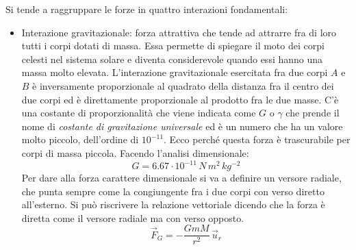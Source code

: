 \documentclass[10pt,a4paper]{book}
\begin{document}
Si tende a raggruppare le forze in quattro interazioni fondamentali:
\begin{itemize}
	\item Interazione gravitazionale: forza attrattiva che tende ad attrarre fra di loro tutti i corpi dotati di massa. Essa permette di spiegare il moto dei corpi celesti nel sistema solare e diventa considerevole quando essi hanno una massa molto elevata. L'interazione gravitazionale esercitata fra due corpi $A$ e $B$ è inversamente proporzionale al quadrato della distanza fra il centro dei due corpi ed è direttamente proporzionale al prodotto fra le due masse. C'è una costante di proporzionalità che viene indicata come $G$ o $\gamma$ che prende il nome di \emph{costante di gravitazione universale} ed è un numero che ha un valore molto piccolo, dell'ordine di $10^{-11}$. Ecco perché questa forza è trascurabile per corpi di massa piccola.
	Facendo l'analisi dimensionale:
	\[
		G=6.67\cdot 10^{-11} \, N\,m^2\,kg^{-2}
	\]
	Per dare alla forza carattere dimensionale si va a definire un versore radiale, che punta sempre come la congiungente fra i due corpi con verso diretto all'esterno. Si può riscrivere la relazione vettoriale dicendo che la forza è diretta come il versore radiale ma con verso opposto.
	\begin{equation}
		\vec{F}_G=-\frac{GmM}{r^2}\,\vec{u}_r
	\end{equation}
	\begin{figure}[htpb]
		\centering
		

		\begin{tikzpicture}[x=0.75pt,y=0.75pt,yscale=-1,xscale=1]


\end{tikzpicture}
\end{figure}
\end{itemize}
\end{document}
